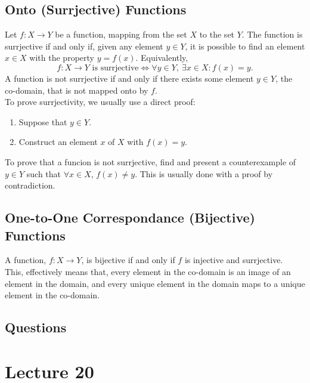 \documentclass{report}
\begin{document}
\subsection*{Onto (Surrjective) Functions}
Let $f:X\to Y$ be a function, mapping from the set $X$ to the set $Y$. The function is surrjective if and only if, given any element $y\in Y$, it is possible to find an element $x\in X$ with the property $y=f(x)$. Equivalently, 
$$
	f:X\to Y \text{ is surrjective} \iff \forall y\in Y,\ \exists x\in X: f(x)=y.
$$
A function is not surrjective if and only if there exists some element $y\in Y$, the co-domain, that is not mapped onto by $f$. \\

To prove surrjectivity, we usually use a direct proof:
\begin{enumerate}
	\item Suppose that $y\in Y$.
	\item Construct an element $x$ of $X$ with $f(x)=y$.
\end{enumerate}
To prove that a funcion is not surrjective, find and present a counterexample of $y\in Y$ such that $\forall x\in X$, $f(x)\neq y$. This is usually done with a proof by contradiction.

\subsection*{One-to-One Correspondance (Bijective) Functions}
A function, $f:X\to Y$, is bijective if and only if $f$ is injective and surrjective. \\

This, effectively means that, every element in the co-domain is an image of an element in the domain, and every unique element in the domain maps to a unique element in the co-domain. \\


\subsection*{Questions}
\qs{}{}

\newpage
\section{Lecture 20}
\end{document}
